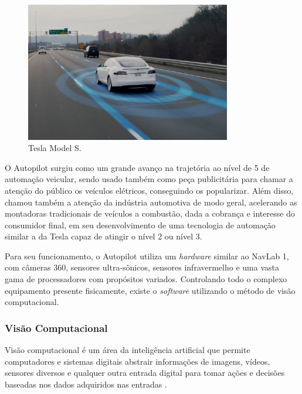 \begin{figure}[htb]
        \centering
        \caption{\label{fig_models}Tesla Model S.}
        \includegraphics[width=0.8\textwidth]{images/01e87df6ce89a7b3ea1141da979d599b.jpg}
\end{figure}

O Autopilot surgiu como um grande avanço na trajetória ao nível de 5 de
automação veicular, sendo usado também como peça publicitária para chamar a
atenção do público os veículos elétricos, conseguindo os popularizar. Além
disso, chamou também a atenção da indústria automotiva de modo geral,
acelerando as montadoras tradicionais de veículos a combustão, dada a cobrança
e interesse do consumidor final, em seu desenvolvimento de uma tecnologia de
automação similar a da Tesla capaz de atingir o  nível 2 ou nível 3.

Para seu funcionamento, o Autopilot utiliza um \textit{hardware} similar ao NavLab 1,
com câmeras 360, sensores ultra-sônicos, sensores infravermelho e uma vasta
gama de processadores com propósitos variados. Controlando todo o complexo
equipamento presente fisicamente, existe o \textit{software} utilizando o método de
visão computacional.

\subsubsection{Vis{\~a}o Computacional}

Visão computacional é um área da inteligência artificial que permite
computadores e sistemas digitais abstrair informações de imagens, vídeos,
sensores diversos e qualquer outra entrada digital para tomar ações e decisões
baseadas nos dados adquiridos nas entradas \cite{ibm2019}.  

